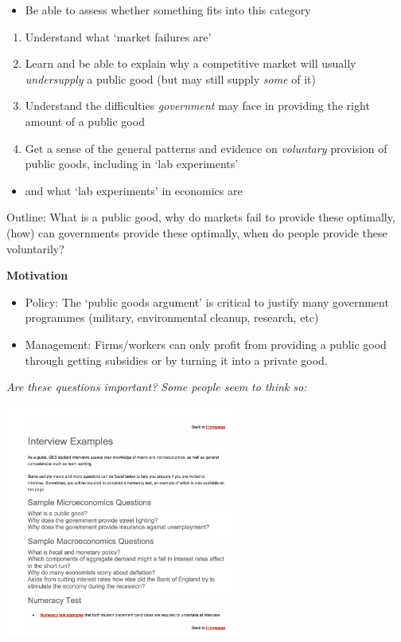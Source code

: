 \documentclass[]{article}
\providecommand{\tightlist}{%
  \setlength{\itemsep}{0pt}\setlength{\parskip}{0pt}}
\begin{document}
\begin{itemize}
\tightlist
\item
  Be able to assess whether something fits into this category
\end{itemize}

\begin{enumerate}
\def\labelenumi{\arabic{enumi}.}
\tightlist
\item
  Understand what `market failures are'
\item
  Learn and be able to explain why a competitive market will usually
  \emph{undersupply} a public good (but may still supply \emph{some} of
  it)
\item
  Understand the difficulties \emph{government} may face in providing
  the right amount of a public good
\item
  Get a sense of the general patterns and evidence on \emph{voluntary}
  provision of public goods, including in `lab experiments'
\end{enumerate}

\begin{itemize}
\tightlist
\item
  and what `lab experiments' in economics are
\end{itemize}

\bigskip

Outline: What is a public good, why do markets fail to provide these
optimally, (how) can governments provide these optimally, when do people
provide these voluntarily?

\bigskip

\textbf{Motivation}

\begin{itemize}
\tightlist
\item
  Policy: The `public goods argument' is critical to justify many
  government programmes (military, environmental cleanup, research, etc)
\item
  Management: Firms/workers can only profit from providing a public good
  through getting subsidies or by turning it into a private good.
\end{itemize}

\emph{Are these questions important? Some people seem to think so:}

\includegraphics[height=3in]{picsfigs/GES_sandwich_qns.png}
\end{document}
